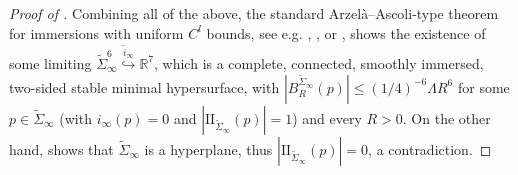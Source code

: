 \documentclass{article}
\newcommand{\R}{\mathbb{R}}
\theoremstyle{definition}
\begin{document}
\begin{proof}[Proof of ]
Combining all of the above, the standard Arzel\`a--Ascoli-type theorem for immersions with uniform $C^l$ bounds, see e.g. \cite{Del00}, \cite{Breu15}, or \cite[Proposition 8.2]{Cho21notes}, shows the existence of some limiting $\widetilde \Sigma_\infty^6\overset{\widetilde i_\infty}{\hookrightarrow} \R^7$, which is a complete, connected, smoothly immersed, two-sided stable minimal hypersurface, with $|B_R^{\widetilde \Sigma_\infty}(p)|\leq (1/4)^{-6}\Lambda R^6$ for some $p\in \widetilde \Sigma_\infty$ (with $i_\infty(p)=0$ and $|\mathrm{II}_{\widetilde \Sigma_\infty}(p)|=1$) and every $R>0$. On the other hand,  shows that $\widetilde \Sigma_\infty$ is a hyperplane, thus $|\mathrm{II}_{\widetilde \Sigma_\infty}(p)|=0$, a contradiction.
\end{proof}




\printbibliography
\end{document}
